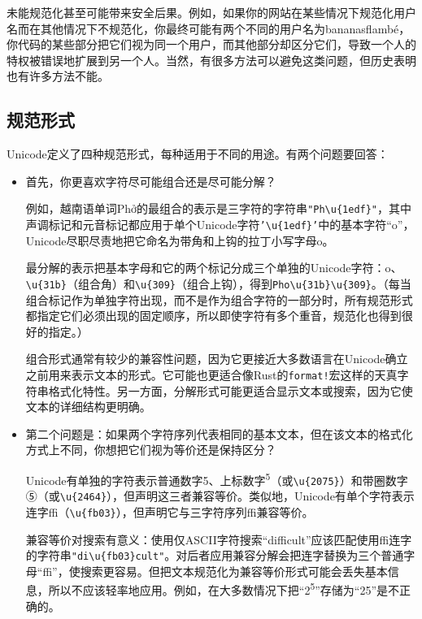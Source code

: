 未能规范化甚至可能带来安全后果。例如，如果你的网站在某些情况下规范化用户名而在其他情况下不规范化，你最终可能有两个不同的用户名为bananasflambé，你代码的某些部分把它们视为同一个用户，而其他部分却区分它们，导致一个人的特权被错误地扩展到另一个人。当然，有很多方法可以避免这类问题，但历史表明也有许多方法不能。

\subsection{规范形式}

Unicode定义了四种规范形式，每种适用于不同的用途。有两个问题要回答：

\begin{itemize}
    \item 首先，你更喜欢字符尽可能组合还是尽可能分解？

    例如，越南语单词Phở的最组合的表示是三字符的字符串\texttt{"Ph\textbackslash u\{1edf\}"}，其中声调标记和元音标记都应用于单个Unicode字符\texttt{'\textbackslash u\{1edf\}'}中的基本字符“o”，Unicode尽职尽责地把它命名为带角和上钩的拉丁小写字母o。

    最分解的表示把基本字母和它的两个标记分成三个单独的Unicode字符：o、\texttt{\textbackslash u\{31b\}}（组合角）和\texttt{\textbackslash u\{309\}}（组合上钩），得到\texttt{Pho\textbackslash u\{31b\}\textbackslash u\{309\}}。（每当组合标记作为单独字符出现，而不是作为组合字符的一部分时，所有规范形式都指定它们必须出现的固定顺序，所以即使字符有多个重音，规范化也得到很好的指定。）

    组合形式通常有较少的兼容性问题，因为它更接近大多数语言在Unicode确立之前用来表示文本的形式。它可能也更适合像Rust的\texttt{format!}宏这样的天真字符串格式化特性。另一方面，分解形式可能更适合显示文本或搜索，因为它使文本的详细结构更明确。

    \item 第二个问题是：如果两个字符序列代表相同的基本文本，但在该文本的格式化方式上不同，你想把它们视为等价还是保持区分？

    Unicode有单独的字符表示普通数字5、上标数字\textsuperscript{5}（或\texttt{\textbackslash u\{2075\}}）和带圈数字⑤（或\texttt{\textbackslash u\{2464\}}），但声明这三者兼容等价。类似地，Unicode有单个字符表示连字ffi（\texttt{\textbackslash u\{fb03\}}），但声明它与三字符序列ffi兼容等价。

    兼容等价对搜索有意义：使用仅ASCII字符搜索“difficult”应该匹配使用ffi连字的字符串\texttt{"di\textbackslash u\{fb03\}cult"}。对后者应用兼容分解会把连字替换为三个普通字母“ffi”，使搜索更容易。但把文本规范化为兼容等价形式可能会丢失基本信息，所以不应该轻率地应用。例如，在大多数情况下把“2\textsuperscript{5}”存储为“25”是不正确的。
\end{itemize}

